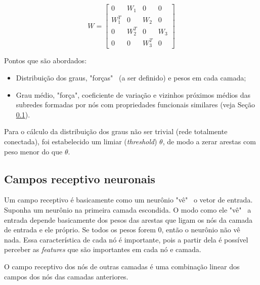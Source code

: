 \documentclass{article}
\begin{document}
        \begin{equation}
            W = \begin{bmatrix}
                    0 & W_1 & 0 & 0 \\
                    W_1^T & 0 & W_2 & 0 \\
                    0 & W_2^T & 0 & W_3 \\
                    0 & 0 & W_3^T & 0
                \end{bmatrix}
        \end{equation}

        Pontos que são abordados:
        
        \begin{itemize}
            \item Distribuição dos graus, "forças" \ (a ser definido) e pesos em cada camada;
            \item Grau médio, "força", coeficiente de variação e vizinhos próximos médios das subredes formadas por nós com propriedades funcionais similares (veja Seção \ref{field}).
        \end{itemize}

        Para o cálculo da distribuição dos graus não ser trivial (rede totalmente conectada), foi estabelecido um limiar (\textit{threshold}) $\theta$, de modo a zerar arestas com peso menor do que $\theta$.

        \subsection{Campos receptivo neuronais}
            \label{field}

            Um campo receptivo é basicamente como um neurônio "vê" \ o vetor de entrada.
            Suponha um neurônio na primeira camada escondida.
            O modo como ele "vê" \ a entrada depende basicamente dos pesos das arestas que ligam os nós da camada de entrada e ele próprio.
            Se todos os pesos forem $0$, então o neurônio não vê nada.
            Essa característica de cada nó é importante, pois a partir dela é possível perceber as \textit{features} que são importantes em cada nó e camada.

            O campo receptivo dos nós de outras camadas é uma combinação linear dos campos dos nós das camadas anteriores.
\end{document}
